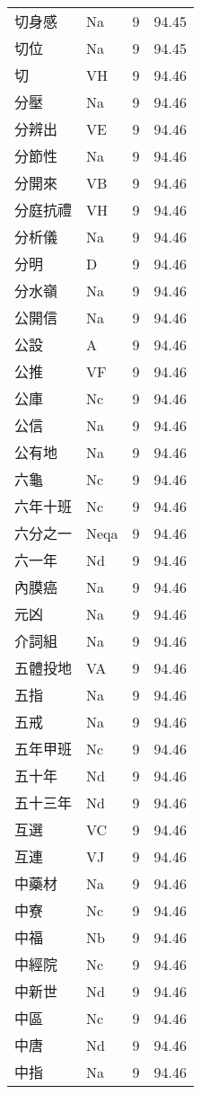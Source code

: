 \documentclass[twocolumn]{book}
\begin{document}
\begin{supertabular}{llrr}
切身感 & Na & 9 &  94.45\\
切位 & Na & 9 &  94.45\\
切 & VH & 9 &  94.46\\
分壓 & Na & 9 &  94.46\\
分辨出 & VE & 9 &  94.46\\
分節性 & Na & 9 &  94.46\\
分開來 & VB & 9 &  94.46\\
分庭抗禮 & VH & 9 &  94.46\\
分析儀 & Na & 9 &  94.46\\
分明 & D & 9 &  94.46\\
分水嶺 & Na & 9 &  94.46\\
公開信 & Na & 9 &  94.46\\
公設 & A & 9 &  94.46\\
公推 & VF & 9 &  94.46\\
公庫 & Nc & 9 &  94.46\\
公信 & Na & 9 &  94.46\\
公有地 & Na & 9 &  94.46\\
六龜 & Nc & 9 &  94.46\\
六年十班 & Nc & 9 &  94.46\\
六分之一 & Neqa & 9 &  94.46\\
六一年 & Nd & 9 &  94.46\\
內膜癌 & Na & 9 &  94.46\\
元凶 & Na & 9 &  94.46\\
介詞組 & Na & 9 &  94.46\\
五體投地 & VA & 9 &  94.46\\
五指 & Na & 9 &  94.46\\
五戒 & Na & 9 &  94.46\\
五年甲班 & Nc & 9 &  94.46\\
五十年 & Nd & 9 &  94.46\\
五十三年 & Nd & 9 &  94.46\\
互選 & VC & 9 &  94.46\\
互連 & VJ & 9 &  94.46\\
中藥材 & Na & 9 &  94.46\\
中寮 & Nc & 9 &  94.46\\
中福 & Nb & 9 &  94.46\\
中經院 & Nc & 9 &  94.46\\
中新世 & Nd & 9 &  94.46\\
中區 & Nc & 9 &  94.46\\
中唐 & Nd & 9 &  94.46\\
中指 & Na & 9 &  94.46\\

\end{supertabular}
\end{document}
